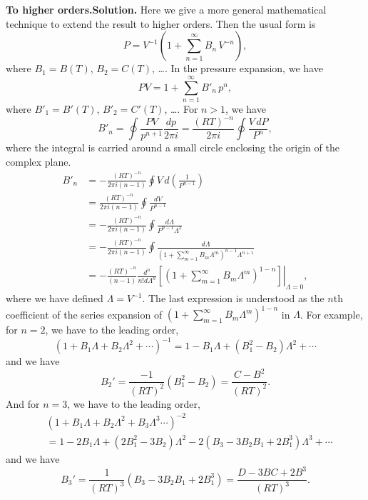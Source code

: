 \documentclass[twocolumn, 10pt]{article}
\numberwithin{equation}{section}
\newenvironment{solution}[1][\empty]
{\par\medskip
  \textbf{\ifx\empty#1{Solution.}\relax\else{#1}\fi} \ignorespaces}
{\medskip}
\begin{document}
\begin{solution}[To higher orders.]
  Here we give a more general mathematical technique
  to extend the result to higher orders.
  Then the usual form is
  $$
  P = V^{-1} \left(1 + \sum_{n=1}^\infty B_n \, V^{-n}\right),
  $$
  where $B_1 = B(T)$, $B_2 = C(T)$, \dots.
  In the pressure expansion, we have
  $$
  P V = 1 + \sum_{n=1}^\infty B'_n \, p^n,
  $$
  where $B'_1 = B'(T)$, $B'_2 = C'(T)$, \dots.
  For $n > 1$, we have
  $$
  B'_n
  =
  \oint \frac{ P V } { p^{n+1} } \frac{d p}{2\pi i}
  =\frac{(RT)^{-n}}{2\pi i}
  \oint \frac{ V \, d P } { P^n }
  ,
  $$
  where the integral is carried around a small circle
  enclosing the origin of the complex plane.
  \begin{align*}
    B'_n
    &= -\frac{(RT)^{-n}}{2\pi i (n-1)} \oint V \, d \left( \frac{ 1 } { P^{n-1} } \right)
    \\
    &= \frac{(RT)^{-n}}{2\pi i (n-1)} \oint \frac{ d V } { P^{n-1} }
    \\
    &= -\frac{(RT)^{-n}}{2\pi i (n-1)} \oint \frac{ d \Lambda } { P^{n-1} \Lambda^2 }
    \\
    &= -\frac{(RT)^{-n}}{2\pi i (n-1)} \oint
    \frac{ d \Lambda } { (1+\sum_{m=1}^\infty B_m \Lambda^m )^{n-1} \Lambda^{n+1} }
    \\
    &= -\frac{(RT)^{-n}}{(n-1)}
      \left.
      \frac{d^n}{n! d \Lambda^n}
      \left[
        \left(1+\sum_{m=1}^\infty B_m \Lambda^m \right)^{1-n}
      \right]
      \right|_{\Lambda = 0}
    ,
  \end{align*}
  where we have defined $\Lambda = V^{-1}$.
  The last expression is understood
  as the $n$th coefficient of the series expansion
  of $(1+\sum_{m=1}^\infty B_m \Lambda^m)^{1-n}$
  in $\Lambda$.
  For example, for $n = 2$, we have
  to the leading order,
  $$
  (1 + B_1 \Lambda + B_2 \Lambda^2 + \cdots)^{-1}
  =
  1 - B_1 \Lambda + (B_1^2 - B_2) \Lambda^2 + \cdots
  $$
  and we have
  $$
  B_2' = \frac{-1}{(RT)^2} (B_1^2 - B_2)
  = \frac{ C - B^2 } { (RT)^2 }.
  $$
  And for $n = 3$, we have
  to the leading order,
  \begin{align*}
  &(1 + B_1 \Lambda + B_2 \Lambda^2 + B_3 \Lambda^3 \cdots)^{-2}
  \\
  &=
  1 - 2B_1 \Lambda + (2 B_1^2 - 3 B_2) \Lambda^2
    -2(B_3 - 3B_2 B_1 + 2B_1^3) \Lambda^3
    + \cdots
  \end{align*}
  and we have
  $$
  B_3' = \frac{1}{(RT)^3} (B_3 - 3 B_2 B_1 + 2 B_1^3)
  = \frac{ D - 3 B C + 2 B^3 } { (RT)^3 }.
  $$
\end{solution}
\end{document}
